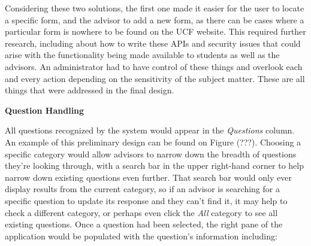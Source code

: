 \documentclass[titlepage, 12pt]{article}
\begin{document}
Considering these two solutions, the first one made it easier for the user to locate a specific form, and the advisor to add a new form, as there can be cases where a particular form is nowhere to be found on the UCF website. This required further research, including about how to write these APIs and security issues that could arise with the functionality being made available to students as well as the advisors. An administrator had to have control of these things and overlook each and every action depending on the sensitivity of the subject matter. These are all things that were addressed in the final design.

\textbf{Question Handling}

All questions recognized by the system would appear in the \emph{Questions} column. An example of this preliminary design can be found on Figure (???). Choosing a specific category would allow advisors to narrow down the breadth of questions they’re looking through, with a search bar in the upper right-hand corner to help narrow down existing questions even further. That search bar would only ever display results from the current category, so if an advisor is searching for a specific question to update its response and they can’t find it, it may help to check a different category, or perhaps even click the \emph{All} category to see all existing questions. Once a question had been selected, the right pane of the application would be populated with the question’s information including:
\end{document}
